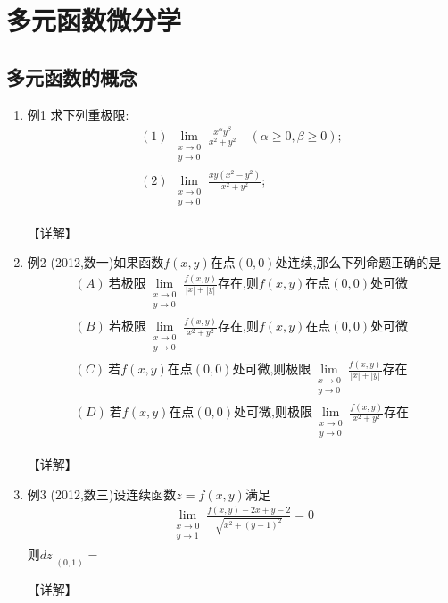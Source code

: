 \documentclass[12pt, a4paper, oneside, UTF8]{ctexbook}
\begin{document}

\else
\fi

\chapter{多元函数微分学}
\section{多元函数的概念}

\begin{enumerate}[label=\arabic*.]
    \item 例1 求下列重极限:
    \begin{align*}
        (1)\ \lim_{\substack{x\to 0\\ y\to 0}}\frac{x^\alpha y^\beta}{x^2+y^2}\quad (\alpha\geq0,\beta\geq0); \\
        (2)\ \lim_{\substack{x\to 0\\ y\to 0}}\frac{xy(x^{2}-y^{2})}{x^{2}+y^{2}};
    \end{align*}
    
    \begin{solution}
    【详解】
    \end{solution}
    
    \item 例2 (2012,数一)如果函数$f(x,y)$在点$(0,0)$处连续,那么下列命题正确的是
    \begin{align*}
        (A)\ \text{若极限}\lim_{\substack{x\to 0\\ y\to 0}}\frac{f(x,y)}{|x|+|y|}\text{存在,则}f(x,y)\text{在点}(0,0)\text{处可微} \\
        (B)\ \text{若极限}\lim_{\substack{x\to 0\\ y\to 0}}\frac{f(x,y)}{x^{2}+y^{2}}\text{存在,则}f(x,y)\text{在点}(0,0)\text{处可微} \\
        (C)\ \text{若}f(x,y)\text{在点}(0,0)\text{处可微,则极限}\lim_{\substack{x\to 0\\ y\to 0}}\frac{f(x,y)}{|x|+|y|}\text{存在} \\
        (D)\ \text{若}f(x,y)\text{在点}(0,0)\text{处可微,则极限}\lim_{\substack{x\to 0\\ y\to 0}}\frac{f(x,y)}{x^{2}+y^{2}}\text{存在}
    \end{align*}
    
    \begin{solution}
    【详解】
    \end{solution}
    
    \item 例3 (2012,数三)设连续函数$z=f(x,y)$满足
    \begin{align*}
        \lim_{\substack{x\to 0\\ y\to 1}}\frac{f(x,y)-2x+y-2}{\sqrt{x^2+(y-1)^2}}=0
    \end{align*}
    则$\left.dz\right|_{(0,1)}=$
    
    \begin{solution}
    【详解】
    \end{solution}
\end{enumerate}
\end{document}
